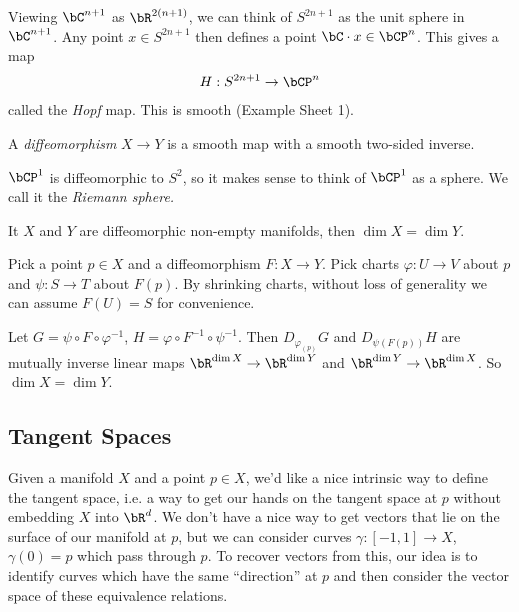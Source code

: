 \begin{example}
	Viewing $\bC^{n+1}$ as $\bR^{2(n+1)}$, we can think of $S^{2n+1}$ as the unit sphere in $\bC^{n+1}$. Any point $x \in S^{2n+1}$ then defines a point $\bC\cdot x \in \bCP^n$. This gives a map
	\begin{align*}
		H:S^{2n+1} \to \bCP^n
	\end{align*}
	called the \emph{Hopf} map. This is smooth (Example Sheet 1).
\end{example}
\begin{defn}\label{defn:diffeomorphism}
	A \emph{diffeomorphism} $X \to Y$ is a smooth map with a smooth two-sided inverse.
\end{defn}
\begin{example}
	$\bCP^1$ is diffeomorphic to $S^2$, so it makes sense to think of $\bCP^1$ as a sphere. We call it the \emph{Riemann sphere.}
\end{example}
\begin{lem}\label{lem:dimension-and-diffeo}
	It $X$ and $Y$ are diffeomorphic non-empty manifolds, then $\dim X = \dim Y$.
\end{lem}
\begin{prf}
	Pick a point $p \in X$ and a diffeomorphism $F:X\to Y$. Pick charts $\varphi:U\to V$ about $p$ and $\psi:S\to T$ about $F(p)$. By shrinking charts, without loss of generality we can assume $F(U) = S$ for convenience.
	\begin{center}
	\end{center}
	Let $G = \psi\circ F \circ \varphi^{-1}$, $H = \varphi\circ F^{-1}\circ \psi^{-1}$. Then $D_{\varphi_{(p)}}G$ and $D_{\psi(F(p))}H$ are mutually inverse linear maps $\bR^{\dim X}\to \bR^{\dim Y}$ and $\bR^{\dim Y}\to \bR^{\dim X}$. So $\dim X = \dim Y$.
\end{prf}

\subsection{Tangent Spaces}
Given a manifold $X$ and a point $p \in X$, we'd like a nice intrinsic way to define the tangent space, i.e. a way to get our hands on the tangent space at $p$ without embedding $X$ into $\bR^d$. We don't have a nice way to get vectors that lie on the surface of our manifold at $p$, but we can consider curves $\gamma:[-1,1]\to X$, $\gamma(0) = p$ which pass through $p$. To recover vectors from this, our idea is to identify curves which have the same ``direction'' at $p$ and then consider the vector space of these equivalence relations.

